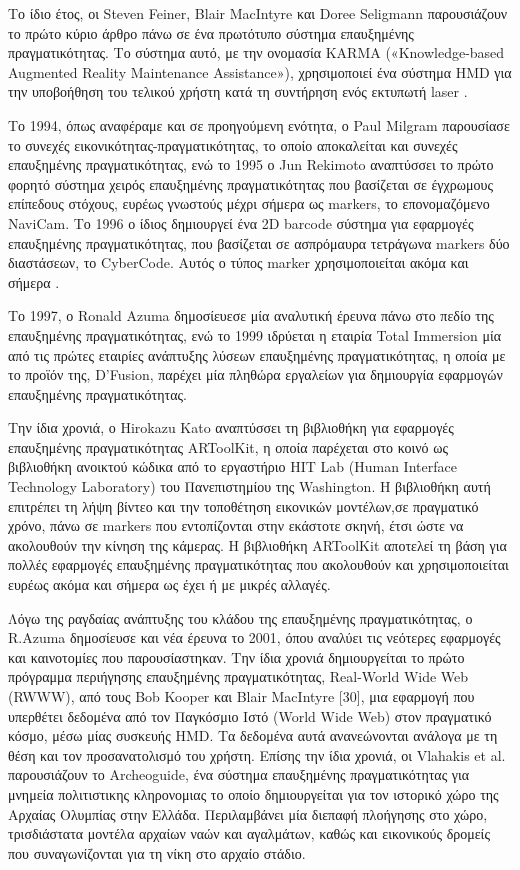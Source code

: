 Το ίδιο έτος, οι Steven Feiner, Blair MacIntyre και Doree Seligmann παρουσιάζουν το πρώτο κύριο άρθρο πάνω σε ένα πρωτότυπο σύστημα επαυξημένης πραγματικότητας. Tο σύστημα αυτό, με την ονομασία KARMA («Knowledge-based Augmented Reality Maintenance Assistance»), χρησιμοποιεί ένα σύστημα HMD για την υποβοήθηση του τελικού χρήστη κατά τη συντήρηση ενός εκτυπωτή laser \cite{feiner1993knowledge}.



Το 1994, όπως αναφέραμε και σε προηγούμενη ενότητα, ο Paul Milgram παρουσίασε το συνεχές εικονικότητας-πραγματικότητας\cite{milgram1994taxonomy}, το οποίο αποκαλείται και συνεχές επαυξημένης πραγματικότητας, ενώ το 1995 ο Jun Rekimoto αναπτύσσει το πρώτο φορητό σύστημα χειρός επαυξημένης πραγματικότητας που βασίζεται σε έγχρωμους επίπεδους στόχους, ευρέως γνωστούς μέχρι σήμερα ως markers, το επονομαζόμενο NaviCam. Το 1996 ο ίδιος δημιουργεί ένα 2D barcode σύστημα για εφαρμογές επαυξημένης πραγματικότητας, που βασίζεται σε ασπρόμαυρα τετράγωνα markers δύο διαστάσεων, το CyberCode. Αυτός ο τύπος marker χρησιμοποιείται ακόμα και σήμερα \cite{arth2015history}.


Το 1997, ο Ronald Azuma δημοσίευεσε μία αναλυτική έρευνα πάνω στο πεδίο της επαυξημένης πραγματικότητας\cite{azuma1997}, ενώ το 1999 ιδρύεται η εταιρία Total Immersion μία από τις πρώτες εταιρίες ανάπτυξης λύσεων επαυξημένης πραγματικότητας, η οποία με το προϊόν της, D’Fusion, παρέχει μία πληθώρα εργαλείων για δημιουργία εφαρμογών επαυξημένης πραγματικότητας.

Την ίδια χρονιά, ο Hirokazu Kato αναπτύσσει τη βιβλιοθήκη για εφαρμογές επαυξημένης πραγματικότητας ARToolKit, η οποία παρέχεται στο κοινό ως βιβλιοθήκη ανοικτού κώδικα από το εργαστήριο ΗΙΤ Lab (Human Interface Technology Laboratory) του Πανεπιστημίου της Washington. H βιβλιοθήκη αυτή επιτρέπει τη λήψη βίντεο και την τοποθέτηση εικονικών μοντέλων,σε πραγματικό χρόνο, πάνω σε markers που εντοπίζονται στην εκάστοτε σκηνή, έτσι ώστε να ακολουθούν την κίνηση της κάμερας. Η βιβλιοθήκη ARToolKit αποτελεί τη βάση για πολλές εφαρμογές επαυξημένης πραγματικότητας που ακολουθούν και χρησιμοποιείται ευρέως ακόμα και σήμερα ως έχει ή με μικρές αλλαγές.



Λόγω της ραγδαίας ανάπτυξης του κλάδου της επαυξημένης πραγματικότητας, ο R.Azuma δημοσίευσε και νέα έρευνα το 2001\cite{azuma2001}, όπου αναλύει τις νεότερες εφαρμογές και καινοτομίες που παρουσίαστηκαν. Την ίδια χρονιά δημιουργείται το πρώτο πρόγραμμα περιήγησης επαυξημένης πραγματικότητας, Real-World Wide Web (RWWW), από τους Bob Kooper και Blair MacIntyre [30], μια εφαρμογή που υπερθέτει δεδομένα από τον Παγκόσμιο Ιστό (World Wide Web) στον πραγματικό κόσμο, μέσω μίας συσκευής HMD. Τα δεδομένα αυτά ανανεώνονται ανάλογα με τη θέση και τον προσανατολισμό του χρήστη. Επίσης την ίδια χρονιά, οι Vlahakis et al. παρουσιάζουν το Archeoguide, ένα σύστημα επαυξημένης πραγματικότητας για μνημεία πολιτιστικης κληρονομιας  το οποίο δημιουργείται για τον ιστορικό χώρο της Αρχαίας Ολυμπίας στην Ελλάδα. Περιλαμβάνει μία διεπαφή πλοήγησης στο χώρο, τρισδιάστατα μοντέλα αρχαίων ναών και αγαλμάτων, καθώς και εικονικούς δρομείς που συναγωνίζονται για τη νίκη στο αρχαίο στάδιο.


